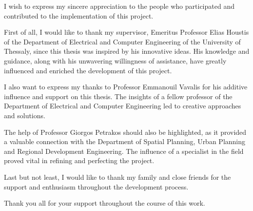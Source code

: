 
\begin{acknowledgements}

I wish to express my sincere appreciation to the people who participated and contributed to the implementation of this project. 

First of all, I would like to thank my supervisor, Emeritus Professor
Elias Houstis of the Department of Electrical and Computer Engineering of the University of
Thessaly, since this thesis was inspired by his innovative ideas. His knowledge and guidance, along with his unwavering willingness of assistance, have greatly influenced and enriched the development of this project.

I also want to express my thanks to Professor Emmanouil Vavalis for his 
additive influence and support on this thesis. The insights of a fellow professor of the Department of Electrical and Computer Engineering led to creative approaches and solutions.

The help of Professor Giorgos Petrakos should also be highlighted, as it provided a valuable connection with the Department of Spatial Planning, Urban Planning and Regional Development Engineering. The influence of a specialist in the field proved vital in refining and perfecting the project.

Last but not least, I would like to thank my family and close friends for the support and enthusiasm throughout the development process.

Thank you all for your support throughout the course of this work.

\end{acknowledgements}